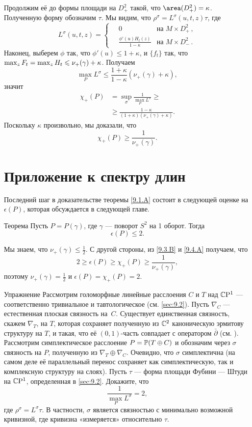 Продолжим её до формы площади на $D_+^2$ такой, что $\area (D_+^2) = \kappa$.
Полученную форму обозначим $\tau$.
Мы видим, что $\rho^\sigma = L^\sigma (u, t, z)\tau$, где 
\[
L^\sigma(u,t,z)=
\begin{cases}
\quad0&\text{на\ } M\times D^2_+\,,
\\
\quad\frac{\phi'(u)H_t(z)}{1-\kappa}&\text{на\ } M\times D^2_-\,.
\end{cases}
\]
Наконец, выберем $\phi$ так, что $\phi' (u) \le 1 + \kappa$, и
$\{f_t\}$ так, что $\max_z F_t \z= \max_z H_t \le \nu_+ (\gamma) +
\kappa$. 
Получаем
\[\max_P L^\sigma \le  \frac{1+\kappa}{1-\kappa} (\nu_+ (\gamma) + \kappa),\]
значит 
\begin{align*}
\chi_+ (P) &= \sup_\sigma \frac1{\max_PL^\sigma}\ge
\\
&\ge\frac{1-\kappa}{(1 + \kappa)(\nu_+ (\gamma) + \kappa)}. 
\end{align*}
Поскольку $\kappa$ произвольно, мы доказали, что 
\[\chi_+ (P) \ge \frac{1}{\nu_+ (\gamma)}.\]
\qeds

\section{Приложение к спектру длин}\label{sec:9.4}

Последний шаг в доказательстве теоремы \ref{9.1.A} состоит в следующей
оценке на $\epsilon(P)$, которая обсуждается в следующей главе.


\begin{thm}{Теорема}\label{9.4.A}
Пусть $P = P(\gamma)$, где $\gamma$ — поворот $S^2$ на 1 оборот.
Тогда
\[\epsilon(P) \le 2.\]
\end{thm}

Мы знаем, что $\nu_+ (\gamma) \le \tfrac12$.
С другой стороны, из \ref{9.3.B} и \ref{9.4.A} получаем, что
\[2 \ge \epsilon(P) \ge \chi_+ (P) \ge\frac1{\nu_+(\gamma)},\]
поэтому $\nu_+ (\gamma) = \tfrac12$ и $\epsilon(P) = \chi_+ (P) = 2$.
\qeds

\begin{ex}{Упражнение}
Рассмотрим голоморфные линейные расслоения $C$ и $T$ над $\mathbb{C}\mathrm{P}^1$ —
соответственно тривиальное и тавтологическое (см. \ref{sec:9.2}). 
Пусть $\nabla_C$ — естественная плоская связность на~$C$.
Существует единственная связность, скажем $\nabla_T$, на $T$,
     которая сохраняет полученную из $\mathbb{C}^2$ каноническую эрмитову
     структуру на $T$, и такая, что её $(0, 1)$-часть совпадает с
     оператором $\bar\partial$ (см. \cite{GH}). 
Рассмотрим симплектическое расслоение $P = \mathbb{P}(T \oplus C)$ и
обозначим через $\sigma$ связность на $P$, полученную из $\nabla_T
\oplus \nabla_C$. 
Очевидно, что $\sigma$ симплектична (на самом деле её параллельный
перенос сохраняет как симплектическую, так и комплексную структуру на
слоях). 
Пусть $\tau$ — форма площади Фубини — Штуди на $\mathbb{C}\mathrm{P}^1$,
определенная в \ref{sec:9.2}. 
Докажите, что 
\[\frac1{\max_P L^\sigma}=2,\]
где $\rho^\sigma = L^\sigma \tau$.
В частности, $\sigma$ является связностью с минимально возможной
кривизной, где кривизна «измеряется» относительно $\tau$.  
\end{ex}
